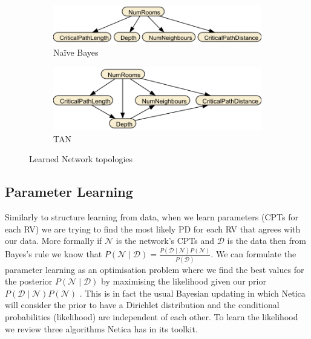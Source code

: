\documentclass{UoYCSproject}
\begin{document}
\begin{figure}[htb]
  \centering
  \begin{subfigure}[b]{0.55\textwidth}
    \centering
    \includegraphics[width=\textwidth]{NBNet.png}
    \caption{Na\"{i}ve Bayes}
  \end{subfigure}
  \hfill
  \begin{subfigure}[b]{0.35\textwidth}
    \centering
    \includegraphics[width=\textwidth]{TANNet.png}
    \caption{TAN}
  \end{subfigure}
  \caption{Learned Network topologies}
  \label{fig:TAN}
\end{figure}


\subsection{Parameter Learning}
Similarly to structure learning from data, when we learn parameters (CPTs for each RV) we are trying to find the most likely PD for each RV that agrees with our data. More formally if \(\mathcal{N}\) is the network's CPTs and \(\mathcal{D}\) is the data then from Bayes's rule we know that \(P(\mathcal{N} \mid \mathcal{D}) = \frac{P(\mathcal{D} \mid \mathcal{N})P(\mathcal{N})}{P(\mathcal{D})}\). We can formulate the parameter learning as an optimisation problem where we find the best values for the posterior \(P(\mathcal{N} \mid \mathcal{D})\) by maximising the likelihood given our prior \(P(\mathcal{D} \mid \mathcal{N})P(\mathcal{N})\) \parencite[46-48]{neticaCman}. This is in fact the usual Bayesian updating in which Netica will consider the prior to have a Dirichlet distribution and the conditional probabilities (likelihood) are independent of each other. To learn the likelihood we review three algorithms Netica has in its toolkit.
 
\end{document}
